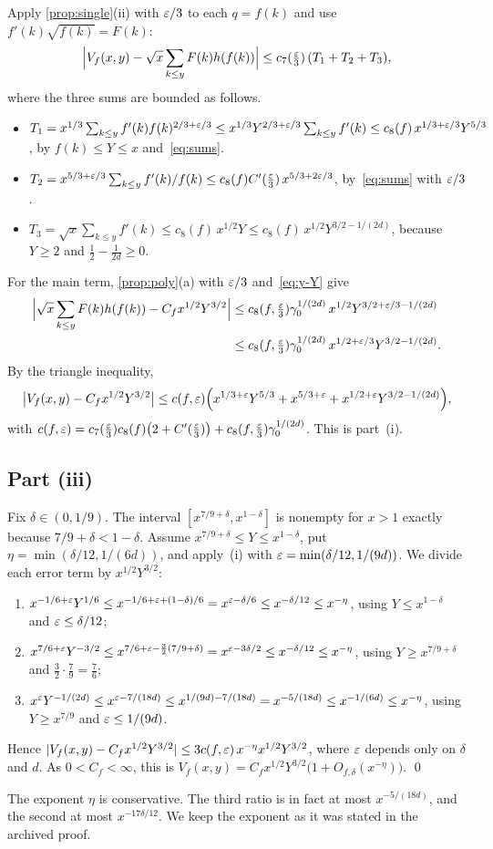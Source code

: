 Apply \cref{prop:single}(ii) with $\varepsilon/3$ to each $q=f(k)$ and use $f'(k)\sqrt{f(k)}=F(k)$:
\[
\Bigl|V_f(x,y)-\sqrt x\sum_{k\le y}F(k)h(f(k))\Bigr|\le c_7(\tfrac{\varepsilon}3)\,(T_1+T_2+T_3),
\]
where the three sums are bounded as follows.
\begin{itemize}
\item $T_1=x^{1/3}\sum_{k\le y}f'(k)f(k)^{2/3+\varepsilon/3}\le x^{1/3}Y^{2/3+\varepsilon/3}\sum_{k\le y}f'(k)\le c_8(f)\,x^{1/3+\varepsilon/3}Y^{5/3}$, by $f(k)\le Y\le x$ and~\eqref{eq:sums}.
\item $T_2=x^{5/3+\varepsilon/3}\sum_{k\le y}f'(k)/f(k)\le c_8(f)C'(\tfrac{\varepsilon}3)\,x^{5/3+2\varepsilon/3}$, by~\eqref{eq:sums} with $\varepsilon/3$.
\item $T_3=\sqrt x\sum_{k\le y}f'(k)\le c_8(f)\,x^{1/2}Y\le c_8(f)\,x^{1/2}Y^{3/2-1/(2d)}$, because $Y\ge2$ and $\frac12-\frac1{2d}\ge0$.
\end{itemize}
For the main term, \cref{prop:poly}(a) with $\varepsilon/3$ and~\eqref{eq:y-Y} give
\begin{align*}
\Bigl|\sqrt x\sum_{k\le y}F(k)h(f(k))-C_fx^{1/2}Y^{3/2}\Bigr|&\le c_8(f,\tfrac{\varepsilon}3)\gamma_0^{1/(2d)}\,x^{1/2}Y^{3/2+\varepsilon/3-1/(2d)}\\
&\le c_8(f,\tfrac{\varepsilon}3)\gamma_0^{1/(2d)}\,x^{1/2+\varepsilon/3}Y^{3/2-1/(2d)}.
\end{align*}
By the triangle inequality,
\[
\bigl|V_f(x,y)-C_fx^{1/2}Y^{3/2}\bigr|\le c(f,\varepsilon)\Bigl(x^{1/3+\varepsilon}Y^{5/3}+x^{5/3+\varepsilon}+x^{1/2+\varepsilon}Y^{3/2-1/(2d)}\Bigr),
\]
with $c(f,\varepsilon)=c_7(\tfrac{\varepsilon}3)c_8(f)\bigl(2+C'(\tfrac{\varepsilon}3)\bigr)+c_8(f,\tfrac{\varepsilon}3)\gamma_0^{1/(2d)}$. This is part~(i).

\subsection{Part (iii)}

Fix $\delta\in(0,1/9)$. The interval $[x^{7/9+\delta},x^{1-\delta}]$ is nonempty for $x>1$ exactly because $7/9+\delta<1-\delta$. Assume $x^{7/9+\delta}\le Y\le x^{1-\delta}$, put $\eta=\min(\delta/12,1/(6d))$, and apply~(i) with $\varepsilon=\min(\delta/12,1/(9d))$. We divide each error term by $x^{1/2}Y^{3/2}$:
\begin{enumerate}[label=\arabic*.]
\item $x^{-1/6+\varepsilon}Y^{1/6}\le x^{-1/6+\varepsilon+(1-\delta)/6}=x^{\varepsilon-\delta/6}\le x^{-\delta/12}\le x^{-\eta}$, using $Y\le x^{1-\delta}$ and $\varepsilon\le\delta/12$;
\item $x^{7/6+\varepsilon}Y^{-3/2}\le x^{7/6+\varepsilon-\frac32(7/9+\delta)}=x^{\varepsilon-3\delta/2}\le x^{-\delta/12}\le x^{-\eta}$, using $Y\ge x^{7/9+\delta}$ and $\frac32\cdot\frac79=\frac76$;
\item $x^{\varepsilon}Y^{-1/(2d)}\le x^{\varepsilon-7/(18d)}\le x^{1/(9d)-7/(18d)}=x^{-5/(18d)}\le x^{-1/(6d)}\le x^{-\eta}$, using $Y\ge x^{7/9}$ and $\varepsilon\le1/(9d)$.
\end{enumerate}
Hence $|V_f(x,y)-C_fx^{1/2}Y^{3/2}|\le3c(f,\varepsilon)\,x^{-\eta}x^{1/2}Y^{3/2}$, where $\varepsilon$ depends only on $\delta$ and $d$. As $0<C_f<\infty$, this is $V_f(x,y)=C_fx^{1/2}Y^{3/2}\bigl(1+O_{f,\delta}(x^{-\eta})\bigr)$. \qed

\begin{remark}
The exponent $\eta$ is conservative. The third ratio is in fact at most $x^{-5/(18d)}$, and the second at most $x^{-17\delta/12}$. We keep the exponent as it was stated in the archived proof.
\end{remark}
